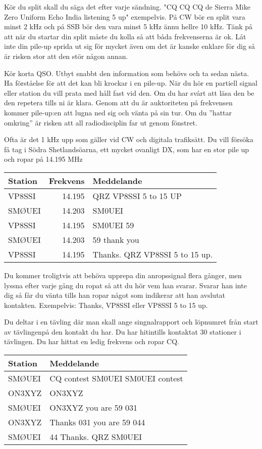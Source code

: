 Kör du split skall du säga det efter varje sändning. "CQ CQ CQ de Sierra Mike
Zero Uniform Echo India listening 5 up" exempelvis. På CW bör en split vara
minst 2 kHz och på SSB bör den vara minst 5 kHz ännu hellre 10 kHz. Tänk på att
när du startar din split måste du kolla så att båda frekvenserna är ok. Låt inte
din pile-up sprida ut sig för mycket även om det är kanske enklare för dig så är
risken stor att den stör någon annan.

Kör korta QSO. Utbyt snabbt den information som behövs och ta sedan nästa. Ha
förståelse för att det kan bli krockar i en pile-up. När du hör en partiell
signal eller station du vill prata med håll fast vid den. Om du har svårt att
läsa den be den repetera tills ni är klara. Genom att du är auktoriteten på
frekvensen kommer pile-up:en att lugna ned sig och vänta på sin tur. Om du
''hattar omkring'' är risken att all radiodisciplin far ut genom fönstret.

Ofta är det 1 kHz upp som gäller vid CW och digitala trafiksätt.  Du vill
försöka få tag i Södra Shetlandsöarna, ett mycket ovanligt DX, som har en stor
pile up och ropar på 14.195 MHz

\begin{tabular}{lrl}
	Station & Frekvens & Meddelande                     \\ \hline
	VP8SSI  &   14.195 & QRZ VP8SSI  5 to 15 UP         \\
	SMØUEI  &   14.203 & SM0UEI                         \\
	VP8SSI  &   14.195 & SM0UEI 59                      \\
	SMØUEI  &   14.203 & 59 thank you                   \\
	VP8SSI  &   14.195 & Thanks. QRZ VP8SSI 5 to 15 up.
\end{tabular}

Du kommer troligtvis att behöva upprepa din anropssignal flera gånger, men
lyssna efter varje gång du ropat så att du hör vem han svarar. Svarar han inte
dig så får du vänta tills han ropar något som indikerar att han avslutat
kontakten. Exempelvis: Thanks, VP8SSI eller VP8SSI 5 to 15 up.

Du deltar i en tävling där man skall ange singnalrapport och löpnumret från
start av tävlingenpå den kontakt du har. Du har hitintills kontaktat 30
stationer i tävlingen. Du har hittat en ledig frekvens och ropar CQ.

\begin{tabular}{ll}
	Station & Meddelande                       \\ \hline
	SMØUEI  & CQ contest SM0UEI SM0UEI contest \\
	ON3XYZ  & ON3XYZ                           \\
	SMØUEI  & ON3XYZ you are 59 031            \\
	ON3XYZ  & Thanks 031 you are 59 044        \\
	SMØUEI  & 44 Thanks. QRZ SM0UEI
\end{tabular}

